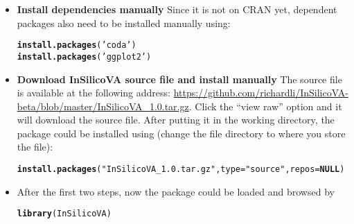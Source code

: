 \documentclass{article}\usepackage[]{graphicx}\usepackage[]{color}
\makeatletter
\newcommand{\hlstr}[1]{\textcolor[rgb]{0.192,0.494,0.8}{#1}}%
\newcommand{\hlstd}[1]{\textcolor[rgb]{0.345,0.345,0.345}{#1}}%
\newcommand{\hlkwa}[1]{\textcolor[rgb]{0.161,0.373,0.58}{\textbf{#1}}}%
\newcommand{\hlkwc}[1]{\textcolor[rgb]{0.333,0.667,0.333}{#1}}%
\newcommand{\hlkwd}[1]{\textcolor[rgb]{0.737,0.353,0.396}{\textbf{#1}}}%
\newenvironment{kframe}{%
 \def\at@end@of@kframe{}%
 \ifinner\ifhmode%
  \def\at@end@of@kframe{\end{minipage}}%
  \begin{minipage}{\columnwidth}%
 \fi\fi%
 \def\FrameCommand##1{\hskip\@totalleftmargin \hskip-\fboxsep
 \colorbox{shadecolor}{##1}\hskip-\fboxsep
     \hskip-\linewidth \hskip-\@totalleftmargin \hskip\columnwidth}%
 \MakeFramed {\advance\hsize-\width
   \@totalleftmargin\z@ \linewidth\hsize
   \@setminipage}}%
 {\par\unskip\endMakeFramed%
 \at@end@of@kframe}
\newenvironment{knitrout}{}{} %
\makeatother
\begin{document}
\begin{itemize}

	\item {\bf Install dependencies manually} Since it is not on CRAN yet, dependent packages also need to be installed manually using:
\begin{knitrout}
\color{fgcolor}\begin{kframe}
\begin{alltt}
\hlkwd{install.packages}\hlstd{(}\hlstr{'coda'}\hlstd{)}
\hlkwd{install.packages}\hlstd{(}\hlstr{'ggplot2'}\hlstd{)}
\end{alltt}
\end{kframe}
\end{knitrout}

	\item {\bf Download InSilicoVA source file and install manually} The source file is available at the following address: \url{https://github.com/richardli/InSilicoVA-beta/blob/master/InSilicoVA_1.0.tar.gz}. Click the ``view raw'' option and it will download the source file. After putting it in the working directory, the package could be installed using (change the file directory to where you store the file):

\begin{knitrout}
\color{fgcolor}\begin{kframe}
\begin{alltt}
\hlkwd{install.packages}\hlstd{(}\hlstr{"InSilicoVA_1.0.tar.gz"}\hlstd{,} \hlkwc{type} \hlstd{=} \hlstr{"source"}\hlstd{,} \hlkwc{repos} \hlstd{=} \hlkwa{NULL}\hlstd{)}
\end{alltt}
\end{kframe}
\end{knitrout}


	\item After the first two steps, now the package could be loaded and browsed by
\begin{knitrout}
\color{fgcolor}\begin{kframe}
\begin{alltt}
\hlkwd{library}\hlstd{(InSilicoVA)}
\end{alltt}
\end{kframe}
\end{knitrout}
\end{itemize}
\end{document}
